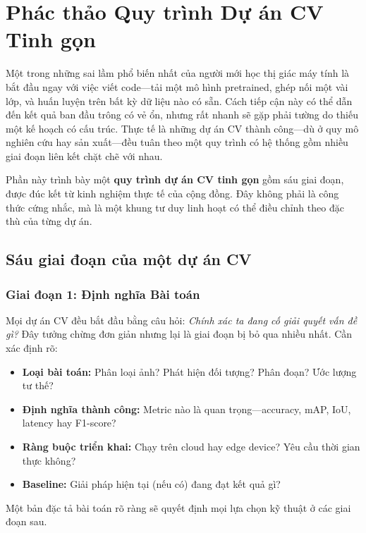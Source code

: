 \section{Phác thảo Quy trình Dự án CV Tinh gọn}
\label{sec:cv_project_workflow}

Một trong những sai lầm phổ biến nhất của người mới học thị giác máy tính là bắt đầu ngay với việc viết code---tải một mô hình pretrained, ghép nối một vài lớp, và huấn luyện trên bất kỳ dữ liệu nào có sẵn. Cách tiếp cận này có thể dẫn đến kết quả ban đầu trông có vẻ ổn, nhưng rất nhanh sẽ gặp phải tường do thiếu một kế hoạch có cấu trúc. Thực tế là những dự án CV thành công---dù ở quy mô nghiên cứu hay sản xuất---đều tuân theo một quy trình có hệ thống gồm nhiều giai đoạn liên kết chặt chẽ với nhau.

Phần này trình bày một \textbf{quy trình dự án CV tinh gọn} gồm sáu giai đoạn, được đúc kết từ kinh nghiệm thực tế của cộng đồng. Đây không phải là công thức cứng nhắc, mà là một khung tư duy linh hoạt có thể điều chỉnh theo đặc thù của từng dự án.

\subsection{Sáu giai đoạn của một dự án CV}
\label{subsec:six_stages}

\subsubsection{Giai đoạn 1: Định nghĩa Bài toán}

Mọi dự án CV đều bắt đầu bằng câu hỏi: \textit{Chính xác ta đang cố giải quyết vấn đề gì?} Đây tưởng chừng đơn giản nhưng lại là giai đoạn bị bỏ qua nhiều nhất. Cần xác định rõ:

\begin{itemize}
    \item \textbf{Loại bài toán:} Phân loại ảnh? Phát hiện đối tượng? Phân đoạn? Ước lượng tư thế?
    \item \textbf{Định nghĩa thành công:} Metric nào là quan trọng---accuracy, mAP, IoU, latency hay F1-score?
    \item \textbf{Ràng buộc triển khai:} Chạy trên cloud hay edge device? Yêu cầu thời gian thực không?
    \item \textbf{Baseline:} Giải pháp hiện tại (nếu có) đang đạt kết quả gì?
\end{itemize}

Một bản đặc tả bài toán rõ ràng sẽ quyết định mọi lựa chọn kỹ thuật ở các giai đoạn sau.

